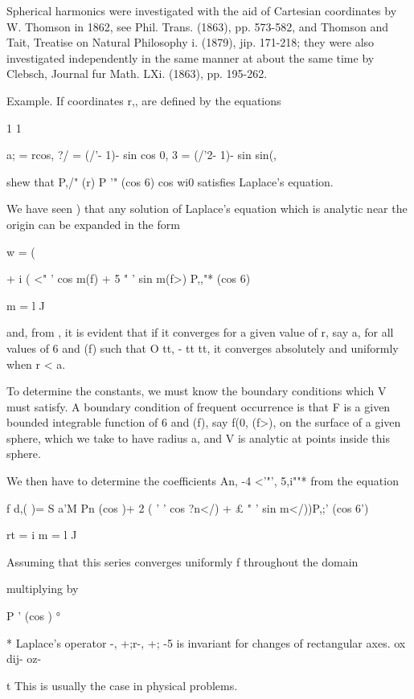 Spherical harmonics were investigated with the aid of Cartesian
coordinates by W. Thomson in 1862, see Phil. Trans. (1863), pp.
573-582, and Thomson and Tait, Treatise on Natural Philosophy i.
(1879), jip. 171-218; they were also investigated independently in
the same manner at about the same time by Clebsch, Journal fur Math.
LXi. (1863), pp. 195-262.

Example. If coordinates r,, are defined by the equations

1 1

a; = rcos, ?/ = (/'- 1)- sin cos 0, 3 = (/'2- 1)- sin sin(,

shew that P,/" (r) P '" (cos 6) cos wi0 satisfies Laplace's equation.


We have seen ) that any solution of Laplace's equation which
is analytic near the origin can be expanded in the form

w = (

+ i ( <" ' cos m(f) + 5 " ' sin m(f>) P,,"* (cos 6) \

m = l J

and, from , it is evident that if it converges for a given value
of r, say a, for all values of 6 and (f) such that O tt, - tt tt, it
converges absolutely and uniformly when r < a.

To determine the constants, we must know the boundary conditions which
V must satisfy. A boundary condition of frequent occurrence is that F
is a given bounded integrable function of 6 and (f), say f(0, (f>), on
the surface of a given sphere, which we take to have radius a, and V
is analytic at points inside this sphere.

We then have to determine the coefficients An, -4 <'"', 5,i""* from
the equation

f d,( )= S a'M Pn (cos )+ 2 ( ' ' cos ?n</) + £ " ' sin m</))P,;' (cos
6')

rt = i m = l J

Assuming that this series converges uniformly f throughout the domain

multiplying by

P ' (cos ) °%

* Laplace's operator -, +;r-, +; -5 is invariant for changes of
rectangular axes. ox dij- oz-

t This is usually the case in physical problems.

